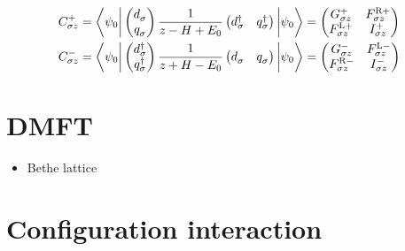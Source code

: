 \begin{subequations}
    \begin{align}
        C^+_{\sigma z}
         & =
        \biggl\langle \psi_0 \biggr|
        \begin{pmatrix}
            d^{\pdag}_\sigma \\
            q^{\pdag}_\sigma
        \end{pmatrix}
        \frac{1}{z - H + E_0}
        \begin{pmatrix}
            d^\dag_\sigma & q^\dag_\sigma
        \end{pmatrix}
        \biggl| \psi_0 \biggr\rangle
        =
        \begin{pmatrix}
            G^+_{\sigma z}      & F^{\mR+}_{\sigma z} \\
            F^{\mL+}_{\sigma z} & I^+_{\sigma z}
        \end{pmatrix} \\
        C^-_{\sigma z}
         & =
        \biggl\langle \psi_0 \biggr|
        \begin{pmatrix}
            d^\dag_\sigma \\
            q^\dag_\sigma
        \end{pmatrix}
        \frac{1}{z + H - E_0}
        \begin{pmatrix}
            d^{\pdag}_\sigma & q^{\pdag}_\sigma
        \end{pmatrix}
        \biggl| \psi_0 \biggr\rangle
        =
        \begin{pmatrix}
            G^-_{\sigma z}      & F^{\mL-}_{\sigma z} \\
            F^{\mR-}_{\sigma z} & I^-_{\sigma z}
        \end{pmatrix}
    \end{align}
\end{subequations}

\section{DMFT}

\begin{itemize}
    \item Bethe lattice
\end{itemize}

\section{Configuration interaction}
